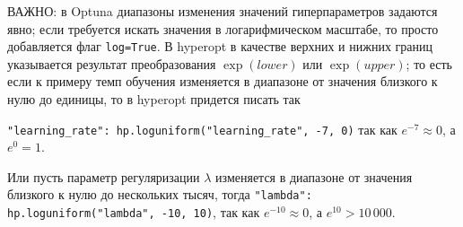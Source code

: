 \documentclass[%
	11pt,
	a4paper,
	utf8,
		]{article}
\begin{document}
ВАЖНО: в Optuna диапазоны изменения значений гиперпараметров задаются явно; если требуется искать значения в логарифмическом масштабе, то просто добавляется флаг \verb|log=True|. В hyperopt в качестве верхних и нижних границ указывается результат преобразования $ \exp(lower) $ или $ \exp(upper) $; то есть если к примеру темп обучения изменяется в диапазоне от значения близкого к нулю до единицы, то в hyperopt придется писать так

\verb|"learning_rate": hp.loguniform("learning_rate", -7, 0)|
так как $ e^{-7} \approx 0 $, а $ e^0 = 1 $.

Или пусть параметр регуляризации $ \lambda $ изменяется в диапазоне от значения близкого к нулю до нескольких тысяч, тогда \verb|"lambda": hp.loguniform("lambda", -10, 10)|, так как $ e^{-10} \approx 0 $, а $ e^{10} > 10 \, 000 $.
\end{document}
